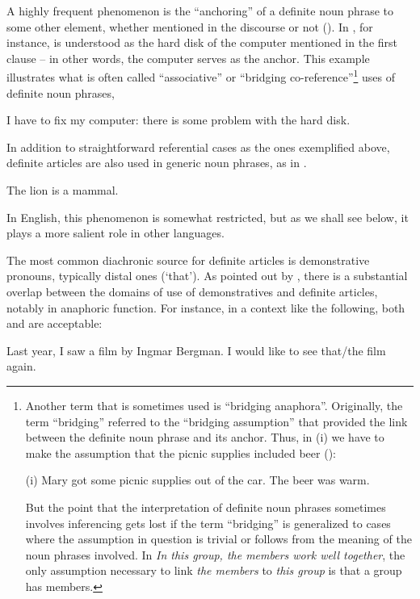 A highly frequent phenomenon is the “anchoring” of a definite noun phrase to some other element, whether mentioned in the discourse or not (\citet[25]{Fraurud1992}). In , for instance,  is understood as the hard disk of the computer mentioned in the first clause – in other words, the computer serves as the anchor.  This example illustrates what is often called “associative” or “bridging co-reference”\footnote{ Another term that is sometimes used is “bridging anaphora”. Originally, the term “bridging” referred to the “bridging assumption” that provided the link between the definite noun phrase and its anchor. Thus, in (i) we have to make the assumption that the picnic supplies included beer (\citet{ClarkEtAl1974}):\par (i) Mary got some picnic supplies out of the car. The beer was warm. \par But the point that the interpretation of definite noun phrases sometimes involves inferencing gets lost if the term “bridging” is generalized to cases where the assumption in question is trivial or follows from the meaning of the noun phrases involved. In \textit{In this group, the members work well together}, the only assumption necessary to link \textit{the members} to \textit{this group} is that a group has members. } uses of definite noun phrases,

\ea
	\gl	\label{bkm:Ref75942712}I have to fix my computer: there is some problem with the hard disk. 
\z 

In addition to straightforward referential cases as the ones exemplified above, definite articles are also used in generic noun phrases, as in . 

\ea 
	\gl	\label{bkm:Ref123549675}The lion is a mammal.
\z 

In English, this phenomenon is somewhat restricted, but as we shall see below, it plays a more salient role in other languages.

The most common diachronic source for definite articles is demonstrative pronouns, typically distal ones (‘that’). As pointed out by \citet[332]{Lyons1999}, there is a substantial overlap between the domains of use of demonstratives and definite articles, notably in anaphoric function. For instance, in a context like the following, both  and  are acceptable:

\ea 
	\gl Last year, I saw a film by Ingmar Bergman. I would like to see that/the film again.
\z 

